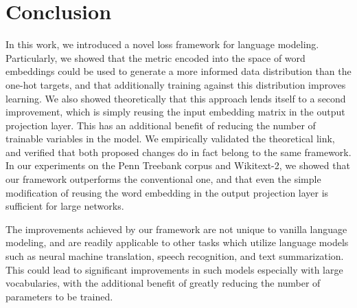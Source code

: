 \section{Conclusion}
In this work, we introduced a novel loss framework for language modeling.
Particularly, we showed that the metric encoded into the space of word embeddings could be used to generate a more informed data distribution than the one-hot targets, and that additionally training against this distribution improves learning.
We also showed theoretically that this approach lends itself to a second improvement, which is simply reusing the input embedding matrix in the output projection layer.
This has an additional benefit of reducing the number of trainable variables in the model.
We empirically validated the theoretical link, and verified that both proposed changes do in fact belong to the same framework.
In our experiments on the Penn Treebank corpus and Wikitext-2, we showed that our framework  outperforms the conventional one, and that even the simple modification of reusing the word embedding in the output projection layer is sufficient for large networks.

The improvements achieved by our framework are not unique to vanilla language modeling, and are readily applicable to other tasks which utilize language models such as neural machine translation, speech recognition, and text summarization.
This could lead to significant improvements in such models especially with large vocabularies, with the additional benefit of greatly reducing the number of parameters to be trained.